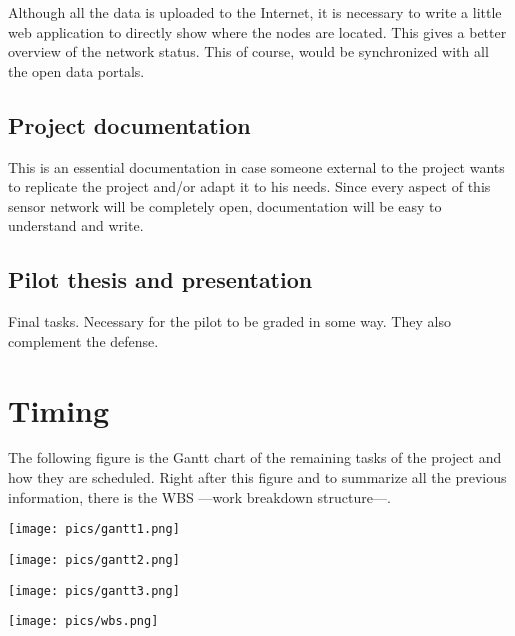 \documentclass[a4paper,english]{article}
\begin{document}
            Although all the data is uploaded to the Internet, it is necessary to write a little web application to directly show where the nodes are located. This gives a better overview of the network status. This of course, would be synchronized with all the open data portals.


        \subsection{Project documentation}

            This is an essential documentation in case someone external to the project wants to replicate the project and/or adapt it to his needs. Since every aspect of this sensor network will be completely open, documentation will be easy to understand and write.


        \subsection{Pilot thesis and presentation}

            Final tasks. Necessary for the pilot to be graded in some way. They also complement the defense.



    \section{Timing}

        The following figure is the Gantt chart of the remaining tasks of the project and how they are scheduled. Right after this figure and to summarize all the previous information, there is the WBS ---work breakdown structure---.

        \begin{center}
            \texttt{[image: pics/gantt1.png]}
        \end{center}


        \begin{center}
            \texttt{[image: pics/gantt2.png]}
        \end{center}


        \begin{center}
            \texttt{[image: pics/gantt3.png]}
        \end{center}


        \begin{center}
            \texttt{[image: pics/wbs.png]}
        \end{center}
            











\end{document}

